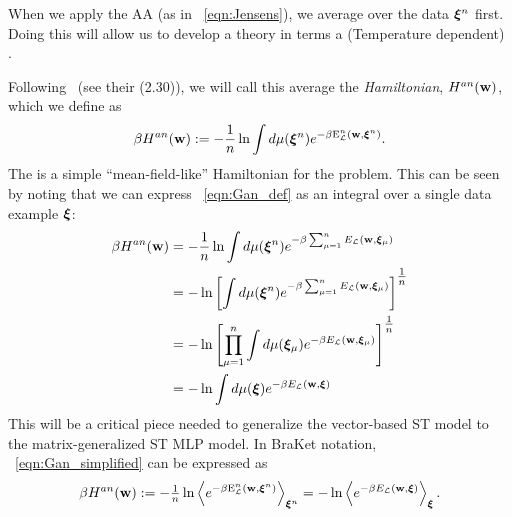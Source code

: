 When we apply the AA (as in \EQN~\ref{eqn:Jensens}), 
we average over the data $\boldsymbol{\xi}^{n}$ first. 
Doing this will allow us to develop a theory in terms a (Temperature dependent) \EffectivePotential. 

Following~\cite{SST92} (see their \EQN(2.30)), we will call this average the \emph{\Annealed Hamiltonian}, $H^{an}({\mathbf{w}})$, 
which we define as  %
  \begin{align}
   \label{eqn:Gan_def}
   \beta H^{an}({\mathbf{w}}):= - \frac{1}{n}\ln  \int d\mu(\boldsymbol{\xi}^{n})e^{-\beta\mathbf{\mathrm{E}}^{n}_{\mathcal{L}}(\mathbf{w}, \boldsymbol{\xi}^{n})}.
  \end{align}
The \AnnealedHamiltonian is a simple ``mean-field-like'' Hamiltonian for the problem.
This can be seen by noting that we can express \EQN~\ref{eqn:Gan_def} as an integral over a single data example $\boldsymbol{\xi}$:
 \begin{align}
   \nonumber
   \beta H^{an}({\mathbf{w}}) &=  - \frac{1}{n}\ln  \int d\mu(\boldsymbol{\xi}^{n})e^{-\beta\sum_{\mu=1}^{n}{E}_{\mathcal{L}}({\mathbf{w}},\boldsymbol{\xi}_{\mu})} \nonumber \\
   &=  - \ln \left[\int d\mu(\boldsymbol{\xi}^{n})e^{-\beta\sum_{\mu=1}^{n}{E}_{\mathcal{L}}({\mathbf{w}},\boldsymbol{\xi}_{\mu})}\right]^{\tfrac{1}{n}} \nonumber \\
   &=  - \ln \left[\prod_{\mu=1}^{n}\int d\mu(\boldsymbol{\xi}_{\mu})e^{-\beta{E}_{\mathcal{L}}({\mathbf{w}},\boldsymbol{\xi}_{\mu})}\right]^{\tfrac{1}{n}} \\ 
   \label{eqn:Gan_simplified}
   &=  - \ln  \int d\mu(\boldsymbol{\xi})e^{-\beta {E}_{\mathcal{L}}({\mathbf{w}},\boldsymbol{\xi})}
 \end{align}
This will be a critical piece needed to generalize the vector-based ST \Perceptron model to the matrix-generalized ST MLP model.
In BraKet notation, \EQN~\ref{eqn:Gan_simplified} can be expressed as
\begin{eqnarray*}
    \beta H^{an}({\mathbf{w}}):=  -\tfrac{1}{n}\ln\left\langle e^{-\beta\mathbf{\mathrm{E}}^{n}_{\mathcal{L}}(\mathbf{w}, \boldsymbol{\xi}^{n})}\right\rangle_{\boldsymbol{\xi}^{n}}= 
    -\ln \left\langle e^{-\beta{E}_{\mathcal{L}}({\mathbf{w}},\boldsymbol{\xi})}\right\rangle_{\boldsymbol{\xi}}.
\end{eqnarray*}

